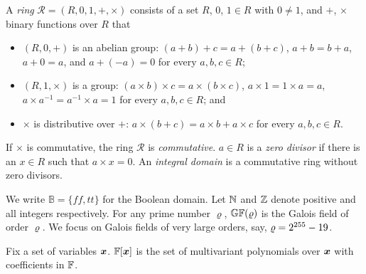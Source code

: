 
A {\em ring} $\mathcal{R} = (R, 0, 1, +, \times)$ consists of a set
$R$, $0$, $1 \in R$ with $0 \neq 1$, and $+$, $\times$ binary
functions over $R$ that
\begin{itemize}
\item $(R, 0, +)$ is an abelian group: $(a + b) + c = a + (b
  + c)$, $a + b = b + a$, $a + 0 = a$, and $a + (-a) = 0$ for every
  $a, b, c \in R$; 
\item $(R, 1, \times)$ is a group: $(a \times b) \times c = a
  \times (b \times c)$, $a \times 1 = 1 \times a = a$, $a \times
  a^{-1} = a^{-1} \times a = 1$ for every $a, b, c \in R$; and 
\item $\times$ is distributive over $+$: $a \times (b + c) = a \times
  b + a \times c$ for every $a, b, c \in R$.
\end{itemize}
If $\times$ is commutative, the ring $\mathcal{R}$ is
\emph{commutative}. $a \in R$ is a \emph{zero divisor} if there is an
$x \in R$ such that $a \times x = 0$. An \emph{integral domain} is a
commutative ring without zero divisors.

We write $\mathbb{B} = \{ \mathit{ff}, \mathit{tt} \}$ for the Boolean
domain. Let $\mathbb{N}$ and $\mathbb{Z}$ denote positive and all integers
respectively. For any prime number $\varrho$, $\mathbb{GF}(\varrho)$ is the
Galois field of order $\varrho$. We focus on Galois fields of very
large orders, say, $\varrho = 2^{255} - 19$. 

Fix a set of variables $\vx$. $\bbfF[\vx]$ is the set of multivariant
polynomials over $\vx$ with coefficients in $\mathbb{F}$. 
